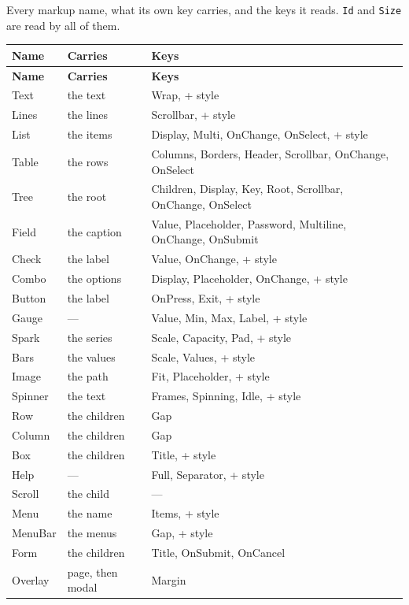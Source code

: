 \documentclass[11pt,a4paper,twoside,openany]{book}
\newcommand{\code}[1]{\texttt{\small #1}}
\begin{document}
Every markup name, what its own key carries, and the keys it reads. \code{Id} and
\code{Size} are read by all of them.

\begin{center}
\small
\begin{longtable}{@{}>{\ttfamily}l >{\ttfamily\footnotesize}L{3.6cm} >{\ttfamily\footnotesize}L{6.4cm}@{}}
\toprule
\textbf{\normalfont\sffamily Name} & \textbf{\normalfont\sffamily Carries} & \textbf{\normalfont\sffamily Keys} \\
\midrule
\endfirsthead
\toprule
\textbf{\normalfont\sffamily Name} & \textbf{\normalfont\sffamily Carries} & \textbf{\normalfont\sffamily Keys} \\
\midrule
\endhead
Text    & the text            & Wrap, + style \\
Lines   & the lines           & Scrollbar, + style \\
List    & the items           & Display, Multi, OnChange, OnSelect, + style \\
Table   & the rows            & Columns, Borders, Header, Scrollbar, OnChange, OnSelect \\
Tree    & the root            & Children, Display, Key, Root, Scrollbar, OnChange, OnSelect \\
Field   & the caption         & Value, Placeholder, Password, Multiline, OnChange, OnSubmit \\
Check   & the label           & Value, OnChange, + style \\
Combo   & the options         & Display, Placeholder, OnChange, + style \\
Button  & the label           & OnPress, Exit, + style \\
Gauge   & ---                 & Value, Min, Max, Label, + style \\
Spark   & the series          & Scale, Capacity, Pad, + style \\
Bars    & the values          & Scale, Values, + style \\
Image   & the path            & Fit, Placeholder, + style \\
Spinner & the text            & Frames, Spinning, Idle, + style \\
Row     & the children        & Gap \\
Column  & the children        & Gap \\
Box     & the children        & Title, + style \\
Help    & ---                 & Full, Separator, + style \\
Scroll  & the child           & --- \\
Menu    & the name            & Items, + style \\
MenuBar & the menus           & Gap, + style \\
Form    & the children        & Title, OnSubmit, OnCancel \\
Overlay & page, then modal    & Margin \\
\bottomrule
\end{longtable}
\end{center}
\end{document}
